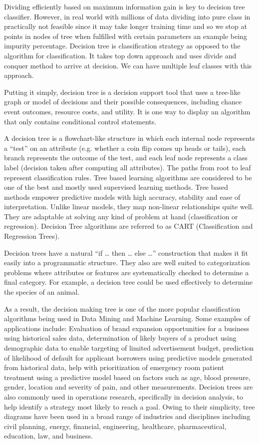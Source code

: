 \documentclass[12pt]{article}
\begin{document}
Dividing efficiently based on maximum information gain is key to decision tree classifier. However, in real world with millions of data dividing into pure class in practically not feasible since it may take longer training time and so we stop at points in nodes of tree when fulfilled with certain parameters an example being impurity percentage. Decision tree is classification strategy as opposed to the algorithm for classification. It takes top down approach and uses divide and conquer method to arrive at decision. We can have multiple leaf classes with this approach.

Putting it simply, decision tree is a decision support tool that uses a tree-like graph or model of decisions and their possible consequences, including chance event outcomes, resource costs, and utility. It is one way to display an algorithm that only contains conditional control statements.

A decision tree is a flowchart-like structure in which each internal node represents a “test” on an attribute (e.g. whether a coin flip comes up heads or tails), each branch represents the outcome of the test, and each leaf node represents a class label (decision taken after computing all attributes). The paths from root to leaf represent classification rules. Tree based learning algorithms are considered to be one of the best and mostly used supervised learning methods. Tree based methods empower predictive models with high accuracy, stability and ease of interpretation. Unlike linear models, they map non-linear relationships quite well. They are adaptable at solving any kind of problem at hand (classification or regression). Decision Tree algorithms are referred to as CART (Classification and Regression Trees).

Decision trees have a natural “if … then … else …” construction that makes it fit easily into a programmatic structure. They also are well suited to categorization problems where attributes or features are systematically checked to determine a final category. For example, a decision tree could be used effectively to determine the species of an animal.

As a result, the decision making tree is one of the more popular classification algorithms being used in Data Mining and Machine Learning. Some examples of applications include: Evaluation of brand expansion opportunities for a business using historical sales data, determination of likely buyers of a product using demographic data to enable targeting of limited advertisement budget, prediction of likelihood of default for applicant borrowers using predictive models generated from historical data, help with prioritization of emergency room patient treatment using a predictive model based on factors such as age, blood pressure, gender, location and severity of pain, and other measurements. Decision trees are also commonly used in operations research, specifically in decision analysis, to help identify a strategy most likely to reach a goal. Owing to their simplicity, tree diagrams have been used in a broad range of industries and disciplines including civil planning, energy, financial, engineering, healthcare, pharmaceutical, education, law, and business.
\end{document}
